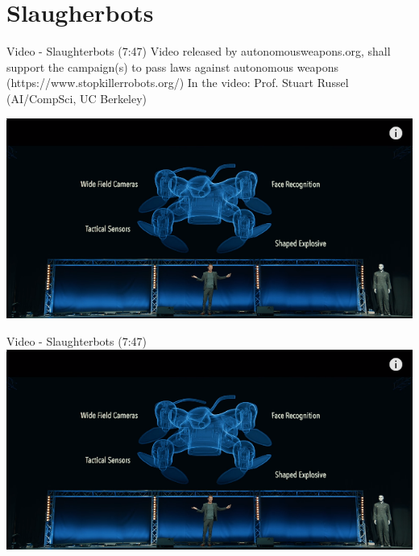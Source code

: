 \documentclass[aspectratio=169]{beamer}
\begin{document}
\section{Slaugherbots}
        \begin{frame}{Video - Slaughterbots (7:47)}
        	\centering
        	Video released by autonomousweapons.org, shall support the campaign(s) to pass laws against autonomous weapons (https://www.stopkillerrobots.org/)
		In the video: Prof. Stuart Russel (AI/CompSci, UC Berkeley)

            {\includegraphics[width=.8\linewidth]{images/slaughterbots.png}}
        \end{frame}

        \begin{frame}{Video - Slaughterbots (7:47)}
        	\centering
            \href{run:./videos/Slaughterbots.mp4?autostart}
            {\includegraphics[width=1\linewidth]{images/slaughterbots.png}}
        \end{frame}
\end{document}
